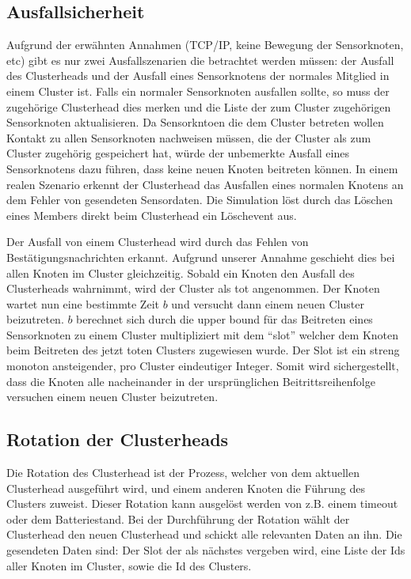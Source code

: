 \subsection{Ausfallsicherheit}
Aufgrund der erw\"ahnten Annahmen (TCP/IP, keine Bewegung der Sensorknoten, etc) gibt es nur zwei Ausfallszenarien die betrachtet werden m\"ussen: der Ausfall des Clusterheads und der Ausfall eines Sensorknotens der normales Mitglied in einem Cluster ist.
Falls ein normaler Sensorknoten ausfallen sollte, so muss der zugeh\"orige Clusterhead dies merken und die Liste der zum Cluster zugeh\"origen Sensorknoten aktualisieren.
Da Sensorkntoen die dem Cluster betreten wollen Kontakt zu allen Sensorknoten nachweisen m\"ussen, die der Cluster als zum Cluster zugeh\"orig gespeichert hat, w\"urde der unbemerkte Ausfall eines Sensorknotens dazu f\"uhren, dass keine neuen Knoten beitreten k\"onnen.
In einem realen Szenario erkennt der Clusterhead das Ausfallen eines normalen Knotens an dem Fehler von gesendeten Sensordaten. Die Simulation löst durch das L\"oschen eines Members direkt beim Clusterhead ein L\"oschevent aus.

Der Ausfall von einem Clusterhead wird durch das Fehlen von Best\"atigungsnachrichten erkannt.
Aufgrund unserer Annahme geschieht dies bei allen Knoten im Cluster gleichzeitig.
Sobald ein Knoten den Ausfall des Clusterheads wahrnimmt, wird der Cluster als tot angenommen.
Der Knoten wartet nun eine bestimmte Zeit $b$ und versucht dann einem neuen Cluster beizutreten.
$b$ berechnet sich durch die upper bound f\"ur das Beitreten eines Sensorknoten zu einem Cluster multipliziert mit dem ``slot'' welcher dem Knoten beim Beitreten des jetzt toten Clusters zugewiesen wurde.
Der Slot ist ein streng monoton ansteigender, pro Cluster eindeutiger Integer.
Somit wird sichergestellt, dass die Knoten alle nacheinander in der urspr\"unglichen Beitrittsreihenfolge versuchen einem neuen Cluster beizutreten.

\subsection{Rotation der Clusterheads}
Die Rotation des Clusterhead ist der Prozess, welcher von dem aktuellen Clusterhead ausgef\"uhrt wird, und einem anderen Knoten die F\"uhrung des Clusters zuweist.
Dieser Rotation kann ausgel\"ost werden von z.B. einem timeout oder dem Batteriestand.
Bei der Durchf\"uhrung der Rotation w\"ahlt der Clusterhead den neuen Clusterhead und schickt alle relevanten Daten an ihn.
Die gesendeten Daten sind:
Der Slot der als n\"achstes vergeben wird, eine Liste der Ids aller Knoten im Cluster, sowie die Id des Clusters.
